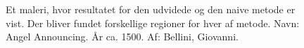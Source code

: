 \begin{figure}[!h]
    \centering
    	\hspace{1em}
    	\hspace{1em}        	    			
        \caption[]{Et maleri, hvor resultatet for den udvidede og den naive metode er vist. Der bliver fundet forskellige regioner for hver af metode. Navn: Angel Announcing. År ca. 1500. Af: Bellini, Giovanni.}
     \label{udvidet_virker3}
\end{figure}

